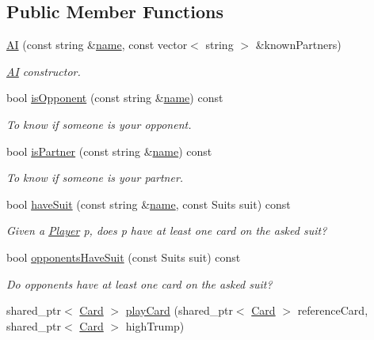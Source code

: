 \subsection*{Public Member Functions}
\begin{DoxyCompactItemize}
\item 
\hyperlink{classAI_a059fcf3ea09f908bca75567937f7e8a7}{A\-I} (const string \&\hyperlink{classPlayer_acf0355128a99ee20ad9931b760fb2de1}{name}, const vector$<$ string $>$ \&known\-Partners)
\begin{DoxyCompactList}\small\item\em \hyperlink{classAI}{A\-I} constructor. \end{DoxyCompactList}\item 
bool \hyperlink{classAI_aec78eb8010bdcd99c899aaa7af79d9ea}{is\-Opponent} (const string \&\hyperlink{classPlayer_acf0355128a99ee20ad9931b760fb2de1}{name}) const 
\begin{DoxyCompactList}\small\item\em To know if someone is your opponent. \end{DoxyCompactList}\item 
bool \hyperlink{classAI_a0cd8c8e4a646c6c1ae51c7812eb1194e}{is\-Partner} (const string \&\hyperlink{classPlayer_acf0355128a99ee20ad9931b760fb2de1}{name}) const 
\begin{DoxyCompactList}\small\item\em To know if someone is your partner. \end{DoxyCompactList}\item 
bool \hyperlink{classAI_a01cd7c1760412dde024605226591328c}{have\-Suit} (const string \&\hyperlink{classPlayer_acf0355128a99ee20ad9931b760fb2de1}{name}, const Suits suit) const 
\begin{DoxyCompactList}\small\item\em Given a \hyperlink{classPlayer}{Player} p, does p have at least one card on the asked suit? \end{DoxyCompactList}\item 
bool \hyperlink{classAI_affad35d086fe81539b07a5626b19c1bb}{opponents\-Have\-Suit} (const Suits suit) const 
\begin{DoxyCompactList}\small\item\em Do opponents have at least one card on the asked suit? \end{DoxyCompactList}\item 
shared\-\_\-ptr$<$ \hyperlink{classCard}{Card} $>$ \hyperlink{classAI_a3f5b2888e03634db701c66f82a4f03a8}{play\-Card} (shared\-\_\-ptr$<$ \hyperlink{classCard}{Card} $>$ reference\-Card, shared\-\_\-ptr$<$ \hyperlink{classCard}{Card} $>$ high\-Trump)

\end{DoxyCompactItemize}
